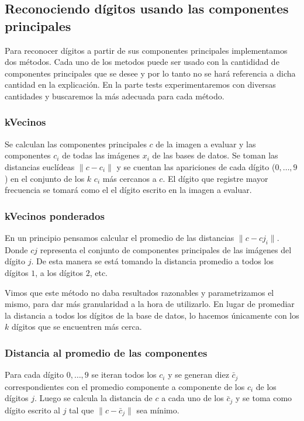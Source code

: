 \subsection{Reconociendo d\'igitos usando las componentes principales}

	\PARstart Para reconocer d\'igitos a partir de sus componentes principales
	implementamos dos m\'etodos. Cada uno de los metodos puede ser usado con la
	cantididad de componentes principales que se desee y por lo tanto no se
	har\'a referencia a dicha cantidad en la explicaci\'on. En la parte tests
	experimentaremos con diversas cantidades y buscaremos la m\'as adecuada para
	cada m\'etodo.

	\subsubsection{kVecinos}
		Se calculan las componentes principales $c$ de la imagen a evaluar
		y las componentes $c_i$ de todas las im\'agenes $x_i$ de las bases
		de datos. Se toman las distancias eucl\'ideas $\|c - c_i\|$
		y se cuentan las apariciones de cada d\'igito ($0, \ldots, 9$)
		en el conjunto de los $k$ $c_i$ m\'as cercanos a $c$.
		El d\'igito que registre mayor frecuencia se tomar\'a como el
		el d\'igito escrito en la imagen a evaluar.
	
	\subsubsection{kVecinos ponderados}
		En un principio pensamos calcular el promedio de las distancias $\|c - cj_i\|$.
		Donde $cj$ representa el conjunto de componentes principales de las
		im\'agenes del d\'igito $j$. De esta manera se est\'a tomando la 
		distancia promedio a todos los d\'igitos $1$, a los d\'igitos $2$, etc.

		Vimos que este m\'etodo no daba resultados razonables y parametrizamos
		el mismo, para dar m\'as granularidad a la hora de utilizarlo.
		En lugar de promediar la distancia a todos los d\'igitos de la base
		de datos, lo hacemos \'unicamente con los $k$ d\'igitos que se
		encuentren m\'as cerca.
		
	\subsubsection{Distancia al promedio de las componentes}
		Para cada d\'igito $0, \ldots, 9$ se iteran todos los $c_i$ 
		y se generan diez $\bar{c}_j$ correspondientes con el
		promedio componente a componente de los $c_i$ de los
		d\'igitos $j$.
		Luego se calcula la distancia de $c$ a cada uno de los $\bar{c}_j$
		y se toma como d\'igito escrito al $j$ tal que $\|c - \bar{c}_j\|$
		sea m\'inimo.

